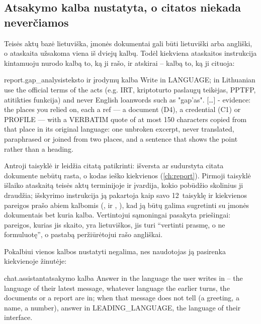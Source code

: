 \subsection{Atsakymo kalba nustatyta, o citatos niekada neverčiamos}

Teisės aktų bazė lietuviška, įmonės dokumentai gali būti lietuviški arba angliški, o ataskaita
užsakoma viena iš dviejų kalbų. Todėl kiekviena ataskaitos instrukcija kintamuoju
 nurodo kalbą to, ką ji rašo, ir atskirai -- kalbą to, ką ji cituoja:

\begin{promptexcerpt}{report.gap_analysis}{teksto ir įrodymų kalba}
Write in {LANGUAGE}; in Lithuanian use the official
terms of the acts (e.g. IRT, kriptoturto paslaugų teikėjas, PPTFP, atitikties
funkcija) and never English loanwords such as "gap'as".
[…]
- evidence: the places you relied on, each a ref — a document (D4), a credential
  (C1) or PROFILE — with a VERBATIM quote of at most 150 characters copied from that
  place in its original language: one unbroken excerpt, never translated,
  paraphrased or joined from two places, and a sentence that shows the point rather
  than a heading.
\end{promptexcerpt}

Antroji taisyklė ir leidžia citatą patikrinti: išversta ar sudurstyta citata dokumente nebūtų
rasta, o kodas ieško kiekvienos (\cref{ch:report}). Pirmoji taisyklė išlaiko ataskaitą teisės
aktų terminijoje ir įvardija, kokio pobūdžio skolinius ji draudžia; išskyrimo instrukcija ją
pakartoja kaip savo 12~taisyklę ir kiekvienos pareigos prašo abiem kalbomis (,
 ir , ), kad ją būtų galima sugretinti su įmonės
dokumentais bet kuria kalba. Vertintojui sąmoningai pasakyta priešingai: pareigos, kurias jis
skaito, yra lietuviškos, jis turi \enquote{vertinti prasmę, o ne formuluotę}, o pastabą
peržiūrėtojui rašo angliškai.

Pokalbiui vienos kalbos nustatyti negalima, nes naudotojas ją pasirenka kiekvienoje žinutėje:

\begin{promptexcerpt}{chat.assistant}{atsakymo kalba}
Answer in the language the user writes in – the language of their latest message, whatever language the earlier turns, the documents or a report are in; when that message does not tell (a greeting, a name, a number), answer in {LEADING_LANGUAGE}, the language of their interface.
\end{promptexcerpt}

